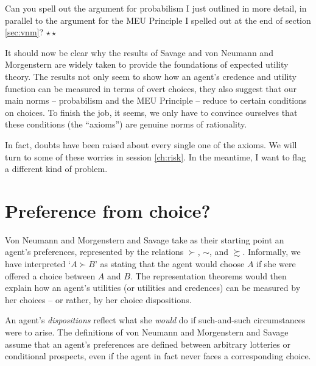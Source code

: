 \begin{exercise}
  Can you spell out the argument for probabilism I just outlined in
  more detail, in parallel to the argument for the MEU Principle I
  spelled out at the end of section \ref{sec:vnm}? $\star\star$
\end{exercise}



It should now be clear why the results of Savage and von Neumann and
Morgenstern are widely taken to provide the foundations of expected
utility theory. The results not only seem to show how an agent's
credence and utility function can be measured in terms of overt
choices, they also suggest that our main norms -- probabilism and the
MEU Principle -- reduce to certain conditions on choices. To finish
the job, it seems, we only have to convince ourselves that these
conditions (the ``axioms'') are genuine norms of rationality.

In fact, doubts have been raised about every single one of the axioms.
We will turn to some of these worries in session \ref{ch:risk}. In the
meantime, I want to flag a different kind of problem.

\section{Preference from choice?}\label{sec:preferences-choices}

Von Neumann and Morgenstern and Savage take as their starting point an
agent's preferences, represented by the relations $\succ$, $\sim$, and
$\succsim$. Informally, we have interpreted `$A \succ B$' as stating
that the agent would choose $A$ if she were offered a choice between
$A$ and $B$. The representation theorems would then explain how an
agent's utilities (or utilities and credences) can be measured by her
choices -- or rather, by her choice dispositions.

An agent's \emph{dispositions} reflect what she \emph{would} do if
such-and-such circumstances were to arise. The definitions of von
Neumann and Morgenstern and Savage assume that an agent's preferences
are defined between arbitrary lotteries or conditional prospects, even
if the agent in fact never faces a corresponding choice.

